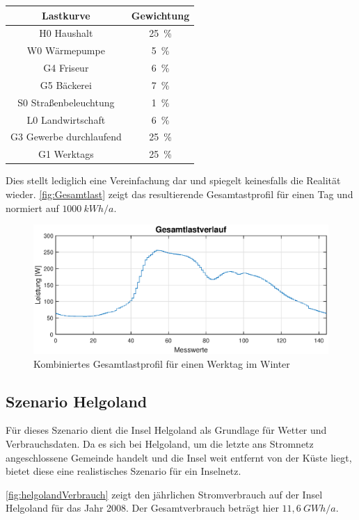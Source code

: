 \begin{center}
	\begin{tabular}[htpb]{c|c}
		\textbf{Lastkurve} & \textbf{Gewichtung} \\
		\hline
		H0 Haushalt & 25~\% \\
		W0 Wärmepumpe & 5~\% \\
		G4 Friseur & 6~\% \\
		G5 Bäckerei & 7~\% \\
		S0 Straßenbeleuchtung & 1~\% \\
		L0 Landwirtschaft & 6~\% \\
		G3 Gewerbe durchlaufend & 25~\% \\
		G1 Werktags & 25~\% 
	\end{tabular}
\end{center}

Dies stellt lediglich eine Vereinfachung dar und spiegelt keinesfalls die Realität wieder. \autoref{fig:Gesamtlast} zeigt das resultierende Gesamtastprofil für einen Tag und normiert auf $1000~kWh/a$.

\begin{figure}[H]
	\centering
	\includegraphics[width=0.8\linewidth]{Abbildungen/Gesamtlast.eps}
	\caption{Kombiniertes Gesamtlastprofil für einen Werktag im Winter}
	\label{fig:Gesamtlast}
\end{figure}

\subsection{Szenario Helgoland}

Für dieses Szenario dient die Insel Helgoland als Grundlage für Wetter und Verbrauchsdaten. Da es sich bei Helgoland, um die letzte ans Stromnetz angeschlossene Gemeinde handelt und die Insel weit entfernt von der Küste liegt, bietet diese eine realistisches Szenario für ein Inselnetz.

\autoref{fig:helgolandVerbrauch} zeigt den jährlichen Stromverbrauch auf der Insel Helgoland für das Jahr 2008. Der Gesamtverbrauch beträgt hier $11,6~GWh/a$.

